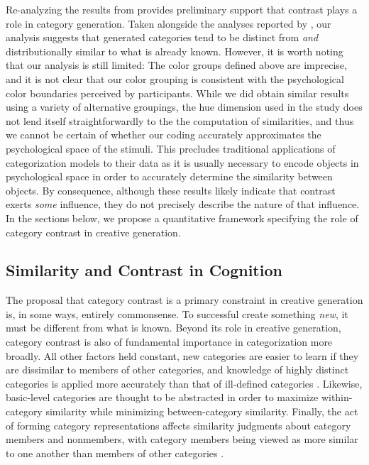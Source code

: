 \documentclass[12pt]{article}
\begin{document}
\begin{flushleft}
Re-analyzing the results from \cite{jern2013probabilistic} provides preliminary
support that contrast plays a role in category generation. Taken alongside the
analyses reported by \cite{jern2013probabilistic}, our analysis suggests that
generated categories tend to be distinct from {\em and} distributionally similar
to what is already known. However, it is worth noting that our analysis is still
limited: The color groups defined above are imprecise, and it is not clear that
our color grouping is consistent with the psychological color boundaries
perceived by participants. While we did obtain similar results using a variety
of alternative groupings, the hue dimension used in the
\cite{jern2013probabilistic} study does not lend itself straightforwardly to the
the computation of similarities, and thus we cannot be certain of whether our
coding accurately approximates the psychological space of the stimuli. This
precludes traditional applications of categorization models to their data as it
is usually necessary to encode objects in psychological space in order to
accurately determine the similarity between objects. By consequence, although
these results likely indicate that contrast exerts {\em some} influence, they do
not precisely describe the nature of that influence. In the sections below, we
propose a quantitative framework specifying the role of category contrast in
creative generation.

\subsection{Similarity and Contrast in Cognition}

The proposal that category contrast is a primary constraint in creative
generation is, in some ways, entirely commonsense. To successful create
something \textit{new}, it must be different from what is known. Beyond its role
in creative generation, category contrast is also of fundamental importance in
categorization more broadly. All other factors held constant, new categories are
easier to learn if they are dissimilar to members of other categories, and
knowledge of highly distinct categories is applied more accurately than that of
ill-defined categories \citep{ashby1994categorization,imai1965discriminability}.
Likewise, basic-level categories \citep{rosch1976basic} are thought to be
abstracted in order to maximize within-category similarity while minimizing
between-category similarity. Finally, the act of forming category
representations affects similarity judgments about category members and
nonmembers, with category members being viewed as more similar to one another
than members of other categories
\citep{goldstone1994influences,goldstone2001altering,goldstone1996isolated}.


\end{flushleft}
\end{document}
